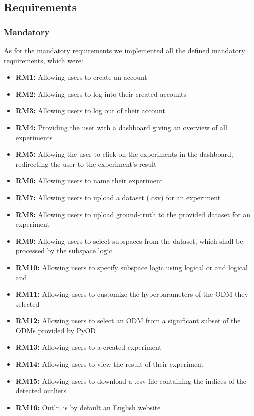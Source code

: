 \newpage
\subsection*{Requirements}
\subsubsection*{Mandatory}
As for the mandatory requirements we implemented all the defined mandatory requirements, which were: 
\begin{itemize}
    \item \textbf{RM1:} Allowing users to create an account
    \item \textbf{RM2:} Allowing users to log into their created accounts
    \item \textbf{RM3:} Allowing users to log out of their account
    \item \textbf{RM4:} Providing the user with a dashboard giving an overview of all experiments
    \item \textbf{RM5:} Allowing the user to click on the experiments in the dashboard, redirecting the user to the experiment's result
    \item \textbf{RM6:} Allowing users to name their experiment
    \item \textbf{RM7:} Allowing users to upload a dataset (.csv) for an experiment
    \item \textbf{RM8:} Allowing users to upload ground-truth to the provided dataset for an experiment
    \item \textbf{RM9:} Allowing users to select subspaces from the dataset, which shall be processed by the subspace logic
    \item \textbf{RM10:} Allowing users to specify subspace logic using logical or and logical and
    \item \textbf{RM11:} Allowing users to customize the hyperparameters of the ODM they selected
    \item \textbf{RM12:} Allowing users to select an ODM from a significant subset of the ODMs provided by PyOD
    \item \textbf{RM13:} Allowing users to a created experiment
    \item \textbf{RM14:} Allowing users to view the result of their experiment
    \item \textbf{RM15:} Allowing users to download a .csv file containing the indices of the detected outliers
    \item \textbf{RM16:} Outlr. is by default an English website

\end{itemize}
